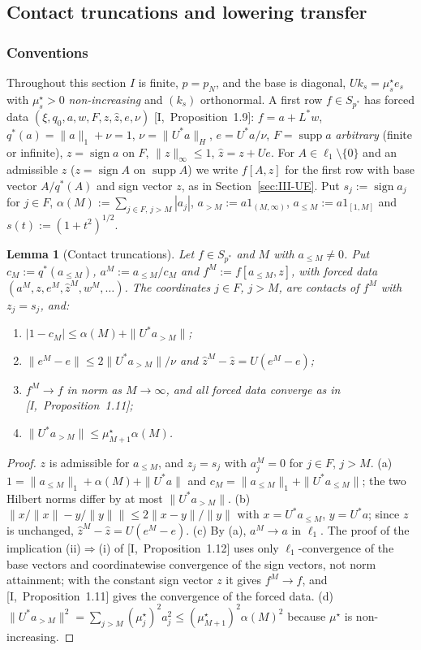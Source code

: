 \documentclass[10pt]{amsart}
\newtheorem{lemma}[theorem]{Lemma}
\theoremstyle{definition}
\theoremstyle{remark}
\newcommand{\supp}{\operatorname{supp}}
\newcommand{\sgn}{\operatorname{sign}}
\newcommand{\zh}{\hat z}
\begin{document}
\subsection{Contact truncations and lowering transfer}\label{subsec:III-trunc}

\subsubsection*{Conventions}
Throughout this section $I$ is finite, $p=p_N$, and the base is diagonal,
$Uk_s=\mu^\star_se_s$ with $\mu^\star_s>0$ \emph{non-increasing} and
$(k_s)$ orthonormal.  A first row $f\in S_{p^*}$ has forced data
$(\xi,q_0,a,w,F,z,\zh,e,\nu)$ [I,~Proposition~1.9]: $f=a+L^*w$,
$q^*(a)=\|a\|_1+\nu=1$, $\nu=\|U^*a\|_H$, $e=U^*a/\nu$, $F=\supp a$
\emph{arbitrary} (finite or infinite), $z=\sgn a$ on $F$, $\|z\|_\infty\le1$,
$\zh=z+Ue$.  For $A\in\ell_1\setminus\{0\}$ and an admissible $z$ ($z=\sgn A$
on $\supp A$) we write $f[A,z]$ for the first row with base vector
$A/q^*(A)$ and sign vector $z$, as in Section~\ref{sec:III-UE}.  Put
$s_j:=\sgn a_j$ for $j\in F$, $\alpha(M):=\sum_{j\in F,\,j>M}|a_j|$,
$a_{>M}:=a1_{(M,\infty)}$, $a_{\le M}:=a1_{[1,M]}$ and $s(t):=(1+t^2)^{1/2}$.

\begin{lemma}[Contact truncations]\label{lem:III-ctrunc}
Let $f\in S_{p^*}$ and $M$ with $a_{\le M}\ne0$.  Put $c_M:=q^*(a_{\le M})$,
$a^M:=a_{\le M}/c_M$ and $f^M:=f[a_{\le M},z]$, with forced data
$(a^M,z,e^M,\zh^M,w^M,\dots)$.  The coordinates $j\in F$, $j>M$, are contacts
of $f^M$ with $z_j=s_j$, and:
\begin{enumerate}
\item[(a)] $|1-c_M|\le\alpha(M)+\|U^*a_{>M}\|$;
\item[(b)] $\|e^M-e\|\le2\|U^*a_{>M}\|/\nu$ and $\zh^M-\zh=U(e^M-e)$;
\item[(c)] $f^M\to f$ in norm as $M\to\infty$, and all forced data converge as
in [I,~Proposition~1.11];
\item[(d)] $\|U^*a_{>M}\|\le\mu^\star_{M+1}\alpha(M)$.
\end{enumerate}
\end{lemma}

\begin{proof}
$z$ is admissible for $a_{\le M}$, and $z_j=s_j$ with $a^M_j=0$ for $j\in F$,
$j>M$.  (a) $1=\|a_{\le M}\|_1+\alpha(M)+\|U^*a\|$ and $c_M=\|a_{\le M}\|_1+
\|U^*a_{\le M}\|$; the two Hilbert norms differ by at most $\|U^*a_{>M}\|$.
(b) $\|x/\|x\|-y/\|y\|\|\le2\|x-y\|/\|y\|$ with $x=U^*a_{\le M}$, $y=U^*a$;
since $z$ is unchanged, $\zh^M-\zh=U(e^M-e)$.  (c) By (a), $a^M\to a$ in
$\ell_1$.  The proof of the implication (ii)$\Rightarrow$(i) of
[I,~Proposition~1.12] uses only $\ell_1$-convergence of the base vectors and
coordinatewise convergence of the sign vectors, not norm attainment; with
the constant sign vector $z$ it gives $f^M\to f$, and [I,~Proposition~1.11]
gives the convergence of the forced data.  (d) $\|U^*a_{>M}\|^2=\sum_{j>M}
(\mu^\star_j)^2a_j^2\le(\mu^\star_{M+1})^2\alpha(M)^2$ because $\mu^\star$ is
non-increasing.
\end{proof}
\end{document}
